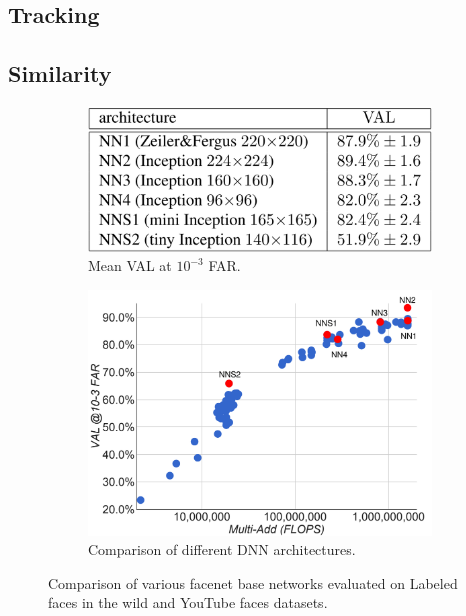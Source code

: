 \documentclass[a4paper,12pt,titlepage]{article}
\numberwithin{figure}{section}
\begin{document}
\subsection{Tracking}

\subsection{Similarity}
\label{sec:similarity}

\begin{figure}
    \begin{subfigure}[Sample1]{0.5\linewidth}
    	\includegraphics[width=0.95\linewidth]{fig/facenet_eval_table.png} 
        \caption{Mean VAL at $10^{-3}$ FAR.}
        \label{fig:facenet_table}
    \end{subfigure}
    \quad
    \begin{subfigure}[Sample1]{0.5\linewidth} 
    	\includegraphics[width=0.95\linewidth]{fig/facenet_eval.png}
        \caption{Comparison of different DNN architectures.}   
        \label{fig:triplet_loss}
    \end{subfigure}
    \caption{Comparison of various facenet\cite{szegedy2016rethinking} base networks evaluated on Labeled faces in the wild\cite{huang2007labeled} and YouTube faces\cite{wolf2011face} datasets.}
    \label{fig:facenet}
\end{figure}
\end{document}
